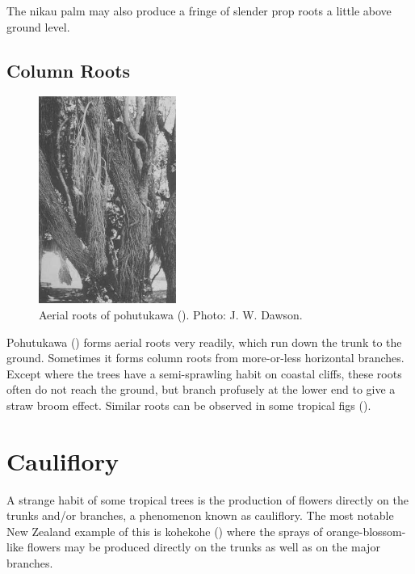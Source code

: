 The nikau palm may also produce a fringe of slender prop roots a little above ground level.

\subsection{Column Roots}

\begin{figure}
	\includegraphics[width=0.4\textwidth]{graphics/figure15pohutakawa.jpg}
	\centering
	\caption[Aerial roots of pohutukawa]{Aerial roots of pohutukawa ().
	Photo:  J. W. Dawson.}%
	\label{fig:15pohutakawa}
\end{figure}

Pohutukawa () forms aerial roots very readily, which run down the trunk to the ground.
Sometimes it forms column roots from more-or-less horizontal branches.
Except where the trees have a semi-sprawling habit on coastal cliffs, these roots often do not reach the ground, but branch profusely at the lower end to give a straw broom effect.
Similar roots can be observed in some tropical figs ().

\section{Cauliflory}

A strange habit of some tropical trees is the production of flowers directly on the trunks and/or branches, a phenomenon known as cauliflory.
The most notable New Zealand example of this is kohekohe () where the sprays of orange-blossom-like flowers may be produced directly on the trunks as well as on the major branches.


